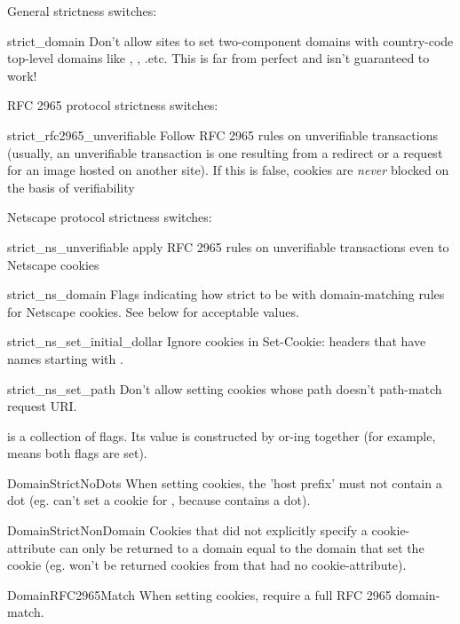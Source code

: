 General strictness switches:

\begin{memberdesc}{strict_domain}
Don't allow sites to set two-component domains with country-code
top-level domains like , ,
.etc.  This is far from perfect and isn't guaranteed to
work!
\end{memberdesc}

RFC 2965 protocol strictness switches:

\begin{memberdesc}{strict_rfc2965_unverifiable}
Follow RFC 2965 rules on unverifiable transactions (usually, an
unverifiable transaction is one resulting from a redirect or a request
for an image hosted on another site).  If this is false, cookies are
\emph{never} blocked on the basis of verifiability
\end{memberdesc}

Netscape protocol strictness switches:

\begin{memberdesc}{strict_ns_unverifiable}
apply RFC 2965 rules on unverifiable transactions even to Netscape
cookies
\end{memberdesc}
\begin{memberdesc}{strict_ns_domain}
Flags indicating how strict to be with domain-matching rules for
Netscape cookies.  See below for acceptable values.
\end{memberdesc}
\begin{memberdesc}{strict_ns_set_initial_dollar}
Ignore cookies in Set-Cookie: headers that have names starting with
.
\end{memberdesc}
\begin{memberdesc}{strict_ns_set_path}
Don't allow setting cookies whose path doesn't path-match request URI.
\end{memberdesc}

 is a collection of flags.  Its value is
constructed by or-ing together (for example,
 means both flags are
set).

\begin{memberdesc}{DomainStrictNoDots}
When setting cookies, the 'host prefix' must not contain a dot
(eg.  can't set a cookie for ,
because  contains a dot).
\end{memberdesc}
\begin{memberdesc}{DomainStrictNonDomain}
Cookies that did not explicitly specify a 
cookie-attribute can only be returned to a domain equal to the domain
that set the cookie (eg.  won't be returned
cookies from  that had no 
cookie-attribute).
\end{memberdesc}
\begin{memberdesc}{DomainRFC2965Match}
When setting cookies, require a full RFC 2965 domain-match.
\end{memberdesc}

